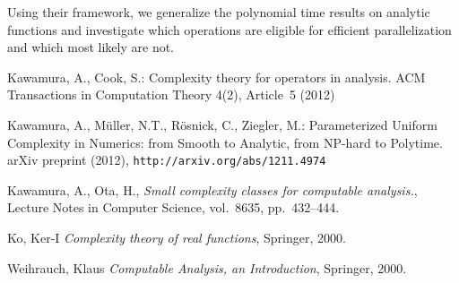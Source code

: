 \documentclass{llncs}
\begin{document}
Using their framework, we generalize the polynomial time results on analytic functions and investigate which operations are eligible for efficient parallelization and which most likely are not.


\begin{thebibliography}{10}
\providecommand{\url}[1]{\texttt{#1}}
\providecommand{\urlprefix}{URL }


Kawamura, A., Cook, S.: Complexity theory for operators in analysis. ACM
  Transactions in Computation Theory  4(2),  Article~5 (2012)

Kawamura, A., M{\"u}ller, N.T., R{\"o}snick, C., Ziegler, M.: {Parameterized
  Uniform Complexity in Numerics: from Smooth to Analytic, from NP-hard to
  Polytime}. arXiv preprint  (2012), \url{http://arxiv.org/abs/1211.4974}

  Kawamura, A., Ota, H.,
  {\it Small complexity classes for computable analysis.},
  Lecture Notes in Computer Science,
  vol.~8635,  pp.~432--444.

Ko, Ker-I
{\it Complexity theory of real functions},
Springer,
2000.

Weihrauch, Klaus
{\it Computable Analysis, an Introduction},
Springer,
2000.
\end{thebibliography}
\end{document}

